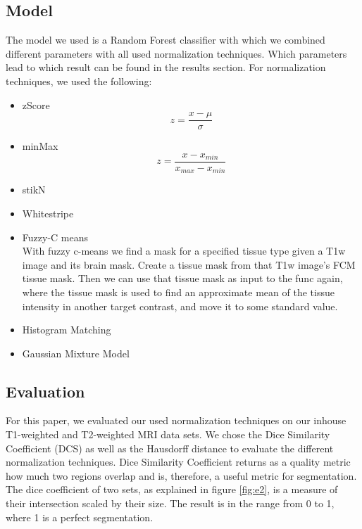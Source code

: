 \documentclass[journal]{IEEEtran}
\begin{document}
\subsection{Model}
	The model we used is a Random Forest classifier with which we combined different parameters with all used normalization techniques. Which parameters
	lead to which result can be found in the results section. For normalization techniques, we used the following:
	\begin{itemize}
		\item zScore
		\begin{equation}
			z = \frac{x - \mu}{\sigma}
		\end{equation}
		\item minMax
		\begin{equation}
			z = \frac{x - x_{min}}{x_{max} - x_{min}}
		\end{equation}
		\item stikN
		\item Whitestripe
		\item Fuzzy-C means\\
		With fuzzy c-means we find a mask for a specified tissue type given a T1w image and its brain mask. Create a tissue mask
		from that T1w image's FCM tissue mask. Then we can use that tissue mask as input to the func again, where the tissue mask is
		used to find an approximate mean of the tissue intensity in	another target contrast, and move it to some standard value.
		\item Histogram Matching
		\item Gaussian Mixture Model
	\end{itemize}
\subsection{Evaluation}
	For this paper, we evaluated our used normalization techniques on our inhouse T1-weighted and T2-weighted MRI data sets. 
	We chose the Dice Similarity Coefficient (DCS) as well as the Hausdorff distance to evaluate the different normalization techniques.
	Dice Similarity Coefficient returns as a quality metric how much two regions overlap and is, therefore, a useful metric for segmentation.
	The dice coefficient of two sets, as explained in figure \ref{fig:e2}, is a measure of their intersection scaled by their size. The result is in the range from 0 to 1, where 1 is a perfect segmentation. 
	
\end{document}
